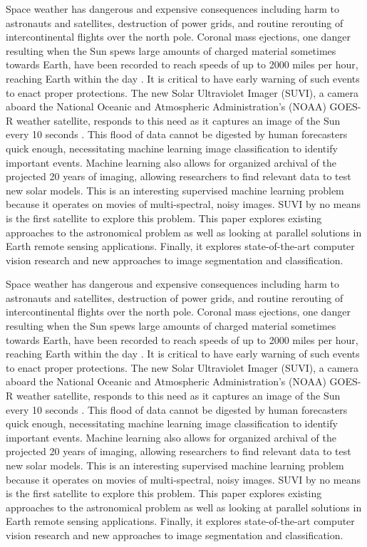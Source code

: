 \documentclass[twoside]{report}
\begin{document}
Space weather has dangerous and expensive consequences including harm to astronauts and satellites, destruction of power grids, and routine rerouting of intercontinental flights over the north pole. Coronal mass ejections, one danger resulting when the Sun spews large amounts of charged material sometimes towards Earth, have been recorded to reach speeds of up to 2000 miles per hour, reaching Earth within the day \cite{fastcme}. It is critical to have early warning of such events to enact proper protections. The new Solar Ultraviolet Imager (SUVI), a camera aboard the National Oceanic and Atmospheric Administration's (NOAA) GOES-R weather satellite, responds to this need as it captures an image of the Sun every 10 seconds \cite{suvibg}. This flood of data cannot be digested by human forecasters quick enough, necessitating machine learning image classification to identify important events. Machine learning also allows for organized archival of the projected 20 years of imaging, allowing researchers to find relevant data to test new solar models. This is an interesting supervised machine learning problem because it operates on movies of multi-spectral, noisy images. SUVI by no means is the first satellite to explore this problem. This paper explores existing approaches to the astronomical problem as well as looking at parallel solutions in Earth remote sensing applications. Finally, it explores state-of-the-art computer vision research and new approaches to image segmentation and classification.

Space weather has dangerous and expensive consequences including harm to astronauts and satellites, destruction of power grids, and routine rerouting of intercontinental flights over the north pole. Coronal mass ejections, one danger resulting when the Sun spews large amounts of charged material sometimes towards Earth, have been recorded to reach speeds of up to 2000 miles per hour, reaching Earth within the day \cite{fastcme}. It is critical to have early warning of such events to enact proper protections. The new Solar Ultraviolet Imager (SUVI), a camera aboard the National Oceanic and Atmospheric Administration's (NOAA) GOES-R weather satellite, responds to this need as it captures an image of the Sun every 10 seconds \cite{suvibg}. This flood of data cannot be digested by human forecasters quick enough, necessitating machine learning image classification to identify important events. Machine learning also allows for organized archival of the projected 20 years of imaging, allowing researchers to find relevant data to test new solar models. This is an interesting supervised machine learning problem because it operates on movies of multi-spectral, noisy images. SUVI by no means is the first satellite to explore this problem. This paper explores existing approaches to the astronomical problem as well as looking at parallel solutions in Earth remote sensing applications. Finally, it explores state-of-the-art computer vision research and new approaches to image segmentation and classification.
\end{document}
